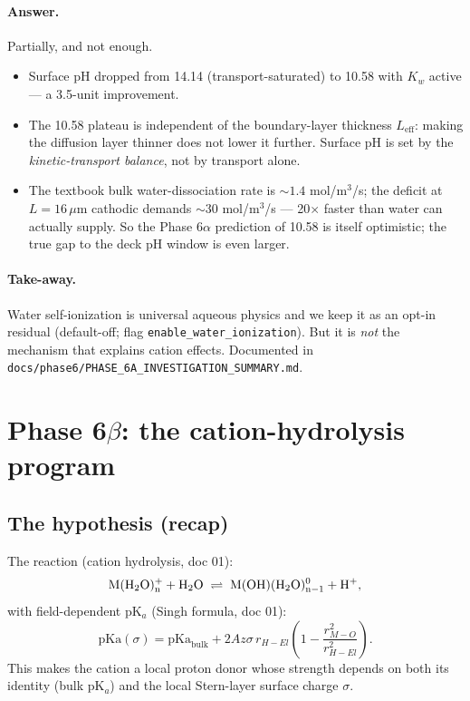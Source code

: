 \documentclass[11pt]{article}
\begin{document}
\paragraph{Answer.} Partially, and not enough.
\begin{itemize}[leftmargin=*]
  \item Surface pH dropped from 14.14 (transport-saturated) to 10.58
        with $K_w$ active --- a 3.5-unit improvement.
  \item The 10.58 plateau is independent of the boundary-layer
        thickness $L_{\mathrm{eff}}$: making the diffusion layer
        thinner does not lower it further. Surface pH is set by the
        \emph{kinetic-transport balance}, not by transport alone.
  \item The textbook bulk water-dissociation rate is
        $\sim 1.4$ mol/m$^3$/s; the deficit at $L = 16\,\mu$m
        cathodic demands $\sim 30$ mol/m$^3$/s --- 20$\times$
        faster than water can actually supply. So the Phase 6$\alpha$
        prediction of 10.58 is itself optimistic; the true gap to
        the deck pH window is even larger.
\end{itemize}

\paragraph{Take-away.} Water self-ionization is universal aqueous
physics and we keep it as an opt-in residual (default-off; flag
\texttt{enable\_water\_ionization}). But it is \emph{not} the
mechanism that explains cation effects. Documented in
\texttt{docs/phase6/PHASE\_6A\_INVESTIGATION\_SUMMARY.md}.

\section{Phase 6$\beta$: the cation-hydrolysis program}

\subsection{The hypothesis (recap)}

The reaction (cation hydrolysis, doc 01):
\[
   \mathrm{M(H_2O)_n^+} + \mathrm{H_2O}
   \;\rightleftharpoons\;
   \mathrm{M(OH)(H_2O)_{n-1}^{0}} + \mathrm{H^+},
\]
with field-dependent pK$_a$ (Singh formula, doc 01):
\[
  \mathrm{pKa}(\sigma) = \mathrm{pKa}_{\mathrm{bulk}}
     + 2 A z \sigma\, r_{H\!-\!El}
       \left(1 - \frac{r_{M-O}^2}{r_{H\!-\!El}^2}\right).
\]
This makes the cation a local proton donor whose strength depends on
both its identity (bulk pK$_a$) and the local Stern-layer surface
charge $\sigma$.
\end{document}
